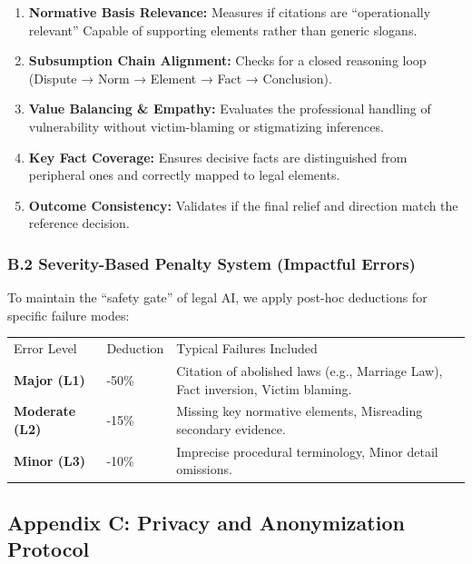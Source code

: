 \begin{enumerate}
\def\labelenumi{\arabic{enumi}.}
\tightlist
\item
  \textbf{Normative Basis Relevance:} Measures if citations are ``operationally relevant'' Capable of supporting elements rather than generic slogans.
\item
  \textbf{Subsumption Chain Alignment:} Checks for a closed reasoning loop (Dispute → Norm → Element → Fact → Conclusion).
\item
  \textbf{Value Balancing \& Empathy:} Evaluates the professional handling of vulnerability without victim-blaming or stigmatizing inferences.
\item
  \textbf{Key Fact Coverage:} Ensures decisive facts are distinguished from peripheral ones and correctly mapped to legal elements.
\item
  \textbf{Outcome Consistency:} Validates if the final relief and direction match the reference decision.
\end{enumerate}

\hypertarget{b.2-severity-based-penalty-system-impactful-errors}{%
\subsubsection{B.2 Severity-Based Penalty System (Impactful Errors)}\label{b.2-severity-based-penalty-system-impactful-errors}}

To maintain the ``safety gate'' of legal AI, we apply post-hoc deductions for specific failure modes:

\begin{longtable}[]{@{}lll@{}}
\toprule
\endhead
Error Level & Deduction & Typical Failures Included \\
\textbf{Major (L1)} & -50\% & Citation of abolished laws (e.g., Marriage Law), Fact inversion, Victim blaming. \\
\textbf{Moderate (L2)} & -15\% & Missing key normative elements, Misreading secondary evidence. \\
\textbf{Minor (L3)} & -10\% & Imprecise procedural terminology, Minor detail omissions. \\
\bottomrule
\end{longtable}

\hypertarget{appendix-c-privacy-and-anonymization-protocol}{%
\subsection{Appendix C: Privacy and Anonymization Protocol}\label{appendix-c-privacy-and-anonymization-protocol}}

